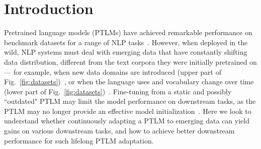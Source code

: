 \section{Introduction}
Pretrained language models (PTLMs) have achieved remarkable performance on benchmark datasets for a range of NLP tasks~\cite{Liu2019RoBERTaAR, brown2020language}. 
However, when deployed in the wild, NLP systems must deal with emerging data that have constantly shifting data distribution, different from the text corpora they were initially pretrained on --- for example, when new data domains are introduced (upper part of Fig.~\ref{fig:datasets})~\cite{Gururangan2020DontSP}, or when the language uses and vocabulary change over time (lower part of Fig.~\ref{fig:datasets})~\cite{Lazaridou2021PitfallsOS}. 
Fine-tuning from a static and possibly ``outdated" PTLM may limit the model performance on downstream tasks, %
as the PTLM may no longer provide an effective model initialization~\cite{beltagy2019scibert, Mller2020COVIDTwitterBERTAN}.
Here we look to understand whether continuously adapting a PTLM to emerging data can yield gains on various downstream tasks, and how to achieve better downstream performance for such lifelong PTLM adaptation.


